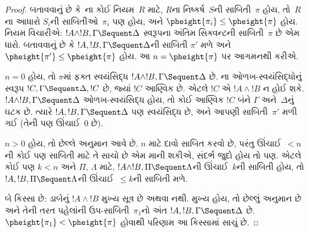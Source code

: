 \begin{proof}
બતાવવાનું છે કે~ના કોઈ નિયમ~$R$ માટે,
$R$ના નિષ્કર્ષ~$S$ની સાબિતી~$\pi$ હોય,
તો~$R$ના આધારો $S_i$ની સાબિતીઓ~$\pi_i$ પણ હોય,
અને $\pheight{\pi_i} \le \pheight{\pi}$ હોય.
\LeftR{\land} નિયમ વિચારીએ:
$!A \land !B, \Gamma \Sequent \Delta$ સ્વરૂપના
અંતિમ સિક્વન્ટની સાબિતી~$\pi$ છે એમ ધારો.
બતાવવાનું છે કે $!A, !B, \Gamma \Sequent \Delta$ની
સાબિતી $\pi'$ મળે અને
$\pheight{\pi'} \le \pheight{\pi}$ હોય.
આ $n = \pheight{\pi}$ પર આગમનથી કરીએ.

$n = 0$ હોય, તો $\pi$માં ફક્ત સ્વયંસિદ્ધ
$!A \land !B, \Gamma \Sequent \Delta$ છે.
ના ઓળખ-સ્વયંસિદ્ધોનું સ્વરૂપ
$!C, \Gamma \Sequent \Delta, !C$ છે, જ્યાં $!C$ આણ્વિક છે.
એટલે $!C$ એ $!A \land !B$ ન હોઈ શકે.
$!A \land !B, \Gamma \Sequent \Delta$ ઓળખ-સ્વયંસિદ્ધ હોય,
તો કોઈ આણ્વિક $!C$ બંને $\Gamma$ અને~$\Delta$નું ઘટક છે.
ત્યારે $!A, !B, \Gamma \Sequent \Delta$ પણ સ્વયંસિદ્ધ છે,
અને આપણી સાબિતી~$\pi'$ મળી ગઈ
(તેની પણ ઊંચાઈ~$0$ છે).

$n>0$ હોય, તો છેલ્લે અનુમાન આવે છે.
$n$ માટે દાવો સાબિત કરવો છે, પરંતુ
ઊંચાઈ~$<n$ની કોઈ પણ સાબિતી માટે તે સાચો છે એમ માની શકીએ,
સંદર્ભ જુદો હોય તો પણ.
એટલે કોઈ પણ $k<n$ અને $\Pi$, $\Lambda$ માટે,
$!A \land !B, \Pi \Sequent \Lambda$ની
ઊંચાઈ~$k$ની સાબિતી હોય,
તો $!A, !B, \Pi \Sequent \Lambda$ની
ઊંચાઈ~$\le k$ની સાબિતી મળે.

બે કિસ્સા છે: ડાબેનું $!A \land !B$ મુખ્ય સૂત્ર છે અથવા નથી.
મુખ્ય હોય, તો છેલ્લું અનુમાન \LeftR{\land} છે
અને તેની તરત પહેલાંની ઉપ-સાબિતી~$\pi_1$નો અંત
$!A, !B, \Gamma \Sequent \Delta$ છે.
$\pheight{\pi_1} < \pheight{\pi}$ હોવાથી પરિણામ આ કિસ્સામાં સાચું છે.


\end{proof}
